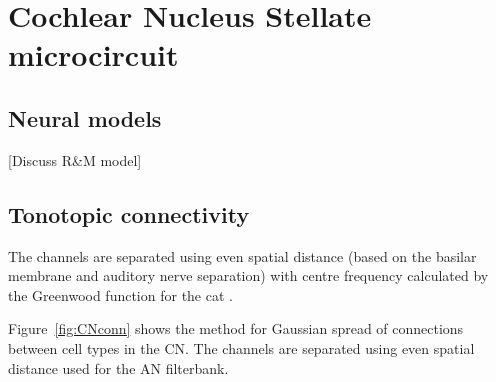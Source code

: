 


\section{Cochlear Nucleus Stellate microcircuit}

\subsection{Neural models}

[Discuss R\&M model]

\medskip{}

\subsection{Tonotopic connectivity}

The channels are separated using even spatial distance (based on the
basilar membrane and auditory nerve separation) with centre frequency
calculated by the Greenwood function for the cat
\citep{Greenwood:1990}.

\medskip{}

Figure~\ref{fig:CNconn} shows the method for Gaussian spread of
connections between cell types in the CN\@.  The channels are separated
using even spatial distance used for the AN filterbank.


